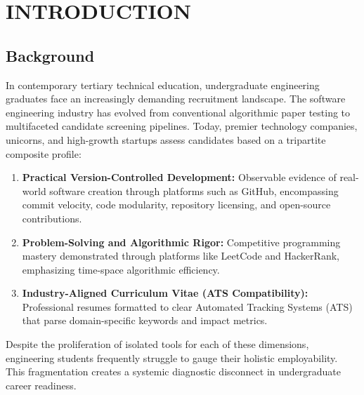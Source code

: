 \chapter{INTRODUCTION}

\section{Background}
In contemporary tertiary technical education, undergraduate engineering graduates face an increasingly demanding recruitment landscape. The software engineering industry has evolved from conventional algorithmic paper testing to multifaceted candidate screening pipelines. Today, premier technology companies, unicorns, and high-growth startups assess candidates based on a tripartite composite profile:
\begin{enumerate}
    \item \textbf{Practical Version-Controlled Development:} Observable evidence of real-world software creation through platforms such as GitHub, encompassing commit velocity, code modularity, repository licensing, and open-source contributions.
    \item \textbf{Problem-Solving and Algorithmic Rigor:} Competitive programming mastery demonstrated through platforms like LeetCode and HackerRank, emphasizing time-space algorithmic efficiency.
    \item \textbf{Industry-Aligned Curriculum Vitae (ATS Compatibility):} Professional resumes formatted to clear Automated Tracking Systems (ATS) that parse domain-specific keywords and impact metrics.
\end{enumerate}

Despite the proliferation of isolated tools for each of these dimensions, engineering students frequently struggle to gauge their holistic employability. This fragmentation creates a systemic diagnostic disconnect in undergraduate career readiness.

